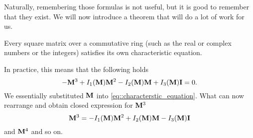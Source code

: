 \documentclass[justified, nobib]{tufte-handout}
\begin{document}
Naturally, remembering those formulas is not useful, but it is good to
remember that they exist. We will now introduce a theorem that will do
a lot of work for us.
\begin{theorem}
	Every square matrix over a commutative ring (such as the real or
	complex numbers or the integers) satisfies its own characteristic equation.
\end{theorem}
\noindent
In practice, this means that the following holds
\begin{equation*}
	-\vb{M}^3 + I_1 \qty(\vb{M})\vb{M}^2 - I_2\qty(\vb{M})\vb{M}
	+ I_3\qty(\vb{M})\vb{I} = 0.
\end{equation*}
We essentially substituted \(\vb{M}\) into \autoref{eq::characterstic_equation}.
What can now rearrange and obtain closed expression for \(\vb{M}^3\)
\begin{equation}\label{eq::third_power}
	\vb{M}^3  = - I_1 \qty(\vb{M})\vb{M}^2 + I_2\qty(\vb{M})\vb{M}
	- I_3\qty(\vb{M})\vb{I}
\end{equation}
and \(\vb{M}^4\) and so on.

\begin{fullwidth}


\end{fullwidth}
\end{document}

